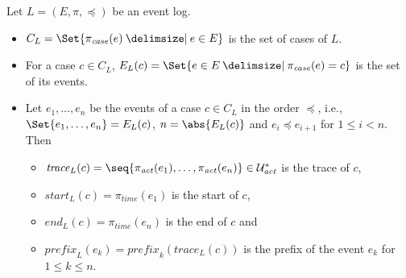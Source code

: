 \begin{definition}
	\label{def:prelim:trace}
	Let $L = (E, \pi, \preceq)$ be an event log.
	\begin{itemize}
		\item $C_L = \Set{\pi_{\mathit{case}}(e) \given e \in E}$ is the set of cases of $L$.
		\item For a case $c \in C_L$, $E_L(c) = \Set{e \in E \given \pi_{\mathit{case}}(e) = c}$ is the set of its events.
		\item Let $e_1, \dots, e_n$ be the events of a case $c \in C_L$ in the order $\preceq$, i.e., $\Set{e_1, \dots, e_n} = E_L(c)$, $n = \abs{E_L(c)}$ and $e_i \preceq e_{i+1}$ for $1 \le i < n$. Then
		      \begin{itemize}
			      \item $\mathit{trace}_L(c) = \seq{\pi_{\mathit{act}}(e_1), \dots, \pi_{\mathit{act}}(e_n)} \in \U{act}^*$ is the trace of $c$,
			      \item $\mathit{start}_L(c) = \pi_{\mathit{time}}(e_1)$ is the start of $c$,
			      \item $\mathit{end}_L(c) = \pi_{\mathit{time}}(e_n)$ is the end of $c$ and
			      \item $\mathit{prefix}_L(e_k) = \mathit{prefix}_k(\mathit{trace}_L(c))$ is the prefix of the event $e_k$ for $1 \le k \le n$.
		      \end{itemize}
	\end{itemize}
\end{definition}


